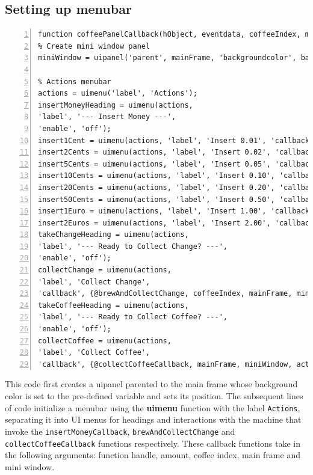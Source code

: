 \documentclass[a4paper, 11pt]{article}
\begin{document}
\subsection{Setting up menubar}
\begin{lstlisting}[style=Matlab-editor, numbers = left, frame = single]
function coffeePanelCallback(hObject, eventdata, coffeeIndex, mainFrame)
% Create mini window panel
miniWindow = uipanel('parent', mainFrame, 'backgroundcolor', backgroundColor, 'position', [0.1 0.1 0.8 0.8]);

% Actions menubar
actions = uimenu('label', 'Actions');
insertMoneyHeading = uimenu(actions, 
'label', '--- Insert Money ---', 
'enable', 'off');
insert1Cent = uimenu(actions, 'label', 'Insert 0.01', 'callback', {@insertMoneyCallback, 0.01, coffeeIndex, mainFrame, miniWindow});
insert2Cents = uimenu(actions, 'label', 'Insert 0.02', 'callback', {@insertMoneyCallback, 0.02, coffeeIndex, mainFrame, miniWindow});
insert5Cents = uimenu(actions, 'label', 'Insert 0.05', 'callback', {@insertMoneyCallback, 0.05, coffeeIndex, mainFrame, miniWindow});
insert10Cents = uimenu(actions, 'label', 'Insert 0.10', 'callback', {@insertMoneyCallback, 0.10, coffeeIndex, mainFrame, miniWindow});
insert20Cents = uimenu(actions, 'label', 'Insert 0.20', 'callback', {@insertMoneyCallback, 0.20, coffeeIndex, mainFrame, miniWindow});
insert50Cents = uimenu(actions, 'label', 'Insert 0.50', 'callback', {@insertMoneyCallback, 0.50, coffeeIndex, mainFrame, miniWindow});
insert1Euro = uimenu(actions, 'label', 'Insert 1.00', 'callback', {@insertMoneyCallback, 1.00, coffeeIndex, mainFrame, miniWindow});
insert2Euros = uimenu(actions, 'label', 'Insert 2.00', 'callback', {@insertMoneyCallback, 2.00, coffeeIndex, mainFrame, miniWindow});
takeChangeHeading = uimenu(actions, 
'label', '--- Ready to Collect Change? ---', 
'enable', 'off');
collectChange = uimenu(actions, 
'label', 'Collect Change', 
'callback', {@brewAndCollectChange, coffeeIndex, mainFrame, miniWindow});
takeCoffeeHeading = uimenu(actions, 
'label', '--- Ready to Collect Coffee? ---', 
'enable', 'off');
collectCoffee = uimenu(actions, 
'label', 'Collect Coffee', 
'callback', {@collectCoffeeCallback, mainFrame, miniWindow, actions});
\end{lstlisting}
\vspace{5mm}

\noindent This code first creates a uipanel parented to the main frame whose background color is set to the pre-defined variable and sets its position. The subsequent lines of code initialize a menubar using the \textbf{uimenu} function with the label \texttt{Actions}, separating it into UI menus for headings and interactions with the machine that invoke the \texttt{insertMoneyCallback}, \texttt{brewAndCollectChange} and \texttt{collectCoffeeCallback} functions respectively. These callback functions take in the following arguments: function handle, amount, coffee index, main frame and mini window. 
\vspace{5mm}
\end{document}
